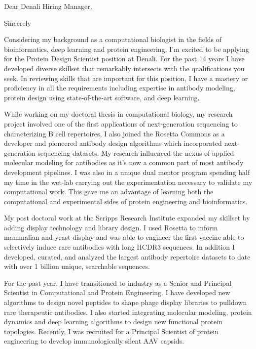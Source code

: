 \documentclass[11pt,a4paper,sans]{moderncv}        %
\title{}                               %
\begin{document}
\date{2020}
\opening{Dear Denali Hiring Manager,}
\closing{Sincerely}
\makelettertitle


Considering my background as a computational biologist in the fields of bioinformatics, deep learning and protein engineering, I'm excited to be applying for the
Protein Design Scientist position at Denali. 
For the past 14 years I have developed diverse skillset that remarkably intersects with the qualifications you seek. In reviewing skills that are important for this position, I have a mastery or proficiency in all the requirements 
including expertise in antibody modeling, protein design using state-of-the-art software, and deep learning.

While working on my doctoral thesis in computational biology, my research project involved one of the first applications of next-generation 
sequencing to characterizing B cell repertoires,
I also joined the Rosetta Commons as a developer and pioneered antibody design algorithms which incorporated next-generation sequencing datasets. My research influenced the nexus of applied molecular modeling for antibodies as it's now a common part of most antibody development pipelines. I was also in a unique dual 
mentor program spending half my time in the wet-lab carrying out the experimentation necessary to validate my computational work. This gave me an advantage 
of learning both the computational and experimental sides of protein engineering and bioinformatics.

\vspace{0.1in}
My post doctoral work at the Scripps Research Institute expanded my skillset by adding display technology and library design. I used Rosetta to inform 
mammalian and yeast 
display and was able to engineer the first vaccine able to selectively induce rare antibodies with long HCDR3 sequences.  In addition I developed, curated, and analyzed the largest antibody 
repertoire datasets to date with over 1 billion unique, searchable sequences.

For the past year, I have transitioned to industry as a 
Senior and Principal Scientist in Computational and Protein Engineering. I have developed new algorithms to design novel peptides to shape phage display libraries to pulldown rare therapeutic antibodies.
I also started integrating molecular modeling, protein dynamics and deep learning algorithms to design new functional protein topologies. Recently, I was recruited for a Principal Scientist of protein engineering to develop immunologically silent AAV capsids. 
\end{document}
